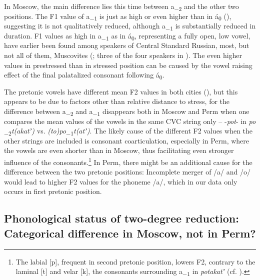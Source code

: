 \documentclass[output=paper,colorlinks,citecolor=black]{langscibook}
\begin{document}
In Moscow, the main difference lies this time between a\textsubscript{\tiny{$-2$}} and the other two positions. The F1 value of a\textsubscript{\tiny{$-1$}} is just as high or even higher than in á\textsubscript{\tiny{$0$}} (), suggesting it is not qualitatively reduced, although a\textsubscript{\tiny{$-1$}} is substantially reduced in duration. F1 values as high in a\textsubscript{\tiny{$-1$}} as in á\textsubscript{\tiny{$0$}}, representing a fully open, low vowel, have earlier been found among speakers of Central Standard Russian, most, but not all of them, Muscovites (\citealt{Kuznecov1997,Knjazev2006}; three of the four speakers in \citealt{Barnes2006}). The even higher values in prestressed than in stressed position can be caused by the vowel raising effect of the final palatalized consonant following á\textsubscript{\tiny{$0$}}.

The pretonic vowels have different mean F2 values in both cities (), but this appears to be due to factors other than relative distance to stress, for the difference between a\textsubscript{\tiny{$-2$}} and a\textsubscript{\tiny{$-1$}} disappears both in Moscow and Perm when one compares the mean values of the vowels in the same CVC string only -- \nobreakdash-\textit{pot}{}- in \textit{po\textsubscript{\tiny{$-2$}}}\textit{t(akatʼ)} vs. \textit{(to)po\textsubscript{\tiny{$-1$}}}\textit{t(atʼ)}. The likely cause of the different F2 values when the other strings are included is consonant coarticulation, especially in Perm, where the vowels are even shorter than in Moscow, thus facilitating even stronger influence of the consonants.\footnote{The labial [p], frequent in second pretonic position, lowers F2, contrary to the laminal [t] and velar [k], the consonants surrounding a\textsubscript{\tiny{$-1$}} in \textit{potakatʼ} (cf. \citealt[65]{Bondarko1977}).} In Perm, there might be an additional cause for the difference between the two pretonic positions: Incomplete merger of /a/ and /o/ would lead to higher F2 values for the phoneme /a/, which in our data only occurs in first pretonic position. 

\subsection{Phonological status of two-degree reduction: Categorical difference in Moscow, not in Perm?}
\label{post:sec:phonology}
\end{document}
